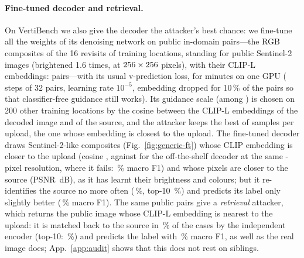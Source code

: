\paragraph{Fine-tuned decoder and retrieval.}
On VertiBench we also give the decoder the attacker's best chance: we fine-tune all the weights of its denoising network on public in-domain pairs---the RGB composites of the 16 revisits of \giftLocs{} training locations, standing for public Sentinel-2 images (brightened 1.6 times, at $256\times256$ pixels), with their CLIP-L embeddings: \giftPairs{} pairs---with its usual v-prediction loss, for \giftMinutes{} minutes on one GPU (\giftSteps{} steps of 32 pairs, learning rate $10^{-5}$, embedding dropped for 10\,\% of the pairs so that classifier-free guidance still works). Its guidance scale (among \giftGuidGrid) is chosen on 200 other training locations by the cosine between the CLIP-L embeddings of the decoded image and of the source, and the attacker keeps the best of \giftNBest{} samples per upload, the one whose embedding is closest to the upload. The fine-tuned decoder draws Sentinel-2-like composites (Fig.~\ref{fig:generic-ft}) whose CLIP embedding is closer to the upload (cosine \giftBestClip, against \giftOffClip{} for the off-the-shelf decoder at the same \giftSize-pixel resolution, where it fails: \giVbOffLabFone\,\% macro F1) and whose pixels are closer to the source (PSNR \giVbBestPsnr\,dB), as it has learnt their brightness and colours; but it re-identifies the source no more often (\giVbBestReid\,\%, top-10 \giVbBestReidTen\,\%) and predicts its label only slightly better (\giVbBestLabFone\,\% macro F1). The same public pairs give a \emph{retrieval} attacker, which returns the public image whose CLIP-L embedding is nearest to the upload: it is matched back to the source in \giVbNnReid\,\% of the cases by the independent encoder (top-10: \giVbNnReidTen\,\%) and predicts the label with \giVbNnLabFone\,\% macro F1, as well as the real image does; App.~\ref{app:audit} shows that this does not rest on siblings.


